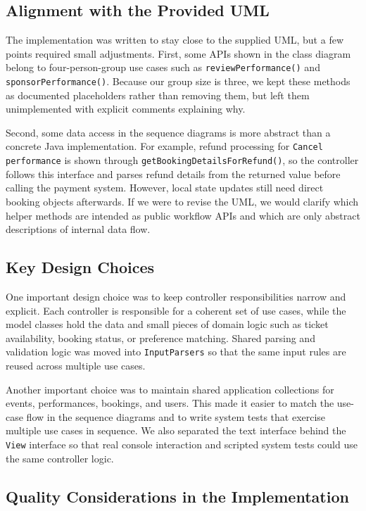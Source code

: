 \documentclass[11pt,a4paper]{article}
\begin{document}
\subsection{Alignment with the Provided UML}

The implementation was written to stay close to the supplied UML, but a few points
required small adjustments. First, some APIs shown in the class diagram belong to
four-person-group use cases such as \texttt{reviewPerformance()} and
\texttt{sponsorPerformance()}. Because our group size is three, we kept these methods as
documented placeholders rather than removing them, but left them unimplemented with
explicit comments explaining why.

Second, some data access in the sequence diagrams is more abstract than a concrete Java
implementation. For example, refund processing for \texttt{Cancel performance} is shown
through \texttt{getBookingDetailsForRefund()}, so the controller follows this interface
and parses refund details from the returned value before calling the payment system.
However, local state updates still need direct booking objects afterwards. If we were to
revise the UML, we would clarify which helper methods are intended as public workflow
APIs and which are only abstract descriptions of internal data flow.

\subsection{Key Design Choices}

One important design choice was to keep controller responsibilities narrow and explicit.
Each controller is responsible for a coherent set of use cases, while the model classes
hold the data and small pieces of domain logic such as ticket availability, booking
status, or preference matching. Shared parsing and validation logic was moved into
\texttt{InputParsers} so that the same input rules are reused across multiple use cases.

Another important choice was to maintain shared application collections for events,
performances, bookings, and users. This made it easier to match the use-case flow in
the sequence diagrams and to write system tests that exercise multiple use cases in
sequence. We also separated the text interface behind the \texttt{View} interface so
that real console interaction and scripted system tests could use the same controller
logic.

\subsection{Quality Considerations in the Implementation}
\end{document}
